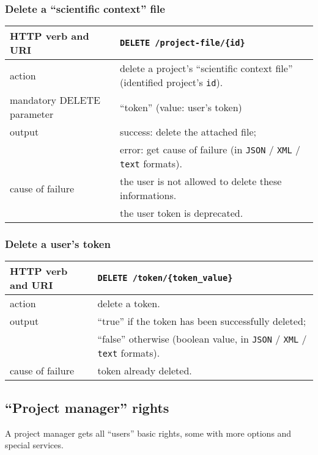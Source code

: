 \subsubsection{Delete a ``scientific context'' file}
\begin{tabular}{ | l | l | }
	\hline
	HTTP verb and URI & \texttt{DELETE /project-file/\{id\}} \\
	\hline
	action & delete a project's ``scientific context file'' (identified \via project's \texttt{id}). \\
	\hline
	mandatory DELETE parameter & ``token'' (value: user's token) \\
	\hline
	output & success: delete the attached file; \\
	\space & error: get cause of failure (in \texttt{JSON} / \texttt{XML} / \texttt{text} formats). \\
	\hline
	cause of failure & the user is not allowed to delete these informations. \\
	\space & the user token is deprecated. \\
	\hline
\end{tabular}
\newline

\subsubsection{Delete a user's token}
\begin{tabular}{ | l | l | }
	\hline
	HTTP verb and URI & \texttt{DELETE /token/\{token\_value\}} \\
	\hline
	action & delete a token. \\
	\hline
	output & ``true'' if the token has been successfully deleted; \\
	\space & ``false'' otherwise (boolean value, in \texttt{JSON} / \texttt{XML} / \texttt{text} formats). \\
	\hline
	cause of failure & token already deleted. \\
	\hline
\end{tabular}
\newline

\subsection{``Project manager'' rights}
\hspace*{\parindent}
A project manager gets all ``users'' basic rights, some with more options and special services.
\newline

